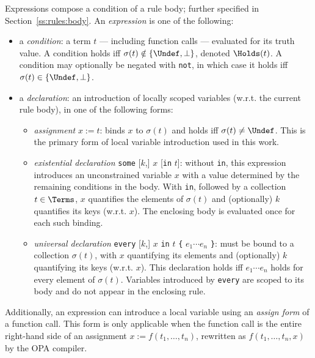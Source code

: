 Expressions compose a condition of a rule body; further specified in Section~\ref{ss:rules:body}.
An \emph{expression} is one of the following:
\begin{itemize}
  \item a \emph{condition}: a term $t$ — including function calls — evaluated for its truth value.
        A condition holds iff $\sigma(t) \notin \{\Undef, \bot\}$, denoted $\Holds(t)$.
        A condition may optionally be negated with \texttt{not}, in which case it holds iff $\sigma(t) \in \{\Undef, \bot\}$.
  \item a \emph{declaration}: an introduction of locally scoped variables (w.r.t. the current rule body), in one of the following forms:
    \begin{itemize}
      \item \emph{assignment} $x \mathrel{:=} t$: binds $x$ to $\sigma(t)$ and holds iff $\sigma(t) \neq \Undef$.
            This is the primary form of local variable introduction used in this work.
      \item \emph{existential declaration} \texttt{some} [$k$,] $x$ [\texttt{in} $t$]:
            without \texttt{in}, this expression introduces an unconstrained variable $x$ with a value determined by the remaining conditions in the body.
            With \texttt{in}, followed by a collection $t \in \Terms$, $x$ quantifies the elements of $\sigma(t)$ and (optionally) $k$ quantifies its keys (w.r.t. $x$).
            The enclosing body is evaluated once for each such binding.
      \item \emph{universal declaration} \texttt{every} [$k$,] $x$ \texttt{in} $t$ \texttt{\{} $e_1 \cdots e_n$ \texttt{\}}:
            must be bound to a collection $\sigma(t)$, with $x$ quantifying its elements and (optionally) $k$ quantifying its keys (w.r.t. $x$).
            This declaration holds iff $e_1 \cdots e_n$ holds for every element of $\sigma(t)$.
            Variables introduced by \texttt{every} are scoped to its body and do not appear in the enclosing rule.
    \end{itemize}
\end{itemize}

Additionally, an expression can introduce a local variable using an \emph{assign form} of a function call.
This form is only applicable when the function call is the entire right-hand side of an assignment $x \mathrel{:=} f(t_1, \ldots, t_n)$, rewritten as $f(t_1, \ldots, t_n, x)$ by the OPA compiler.

